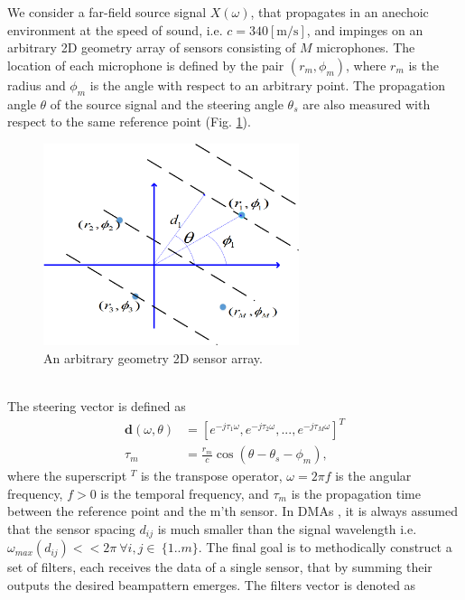 \documentclass{article}
\begin{document}
We consider a far-field source signal $ X(\omega) $, that propagates in an anechoic environment at the speed of sound, i.e. $ c=340 \mathrm{[m/s]} $, and impinges on an arbitrary 2D geometry array of sensors consisting of $ M $ microphones. 
The location of each microphone is defined by the pair $ \left(r_m,\phi_m\right) $, where $ r_m $ is the radius and $ \phi_m $ is the angle with respect to an arbitrary point.
The propagation angle $ \theta $ of the source signal and the steering angle $ \theta_s $ are also measured with respect to the same reference point (Fig. \ref{FigLbl_ArrShape}).
\begin{figure}[h]
	\centerline{\includegraphics[width=75mm,trim={2cm 2cm 2cm 4cm},clip]{ProblemFormulationVisio.png}} \caption{An arbitrary geometry 2D sensor array.}\label{FigLbl_ArrShape}
\end{figure}\\
The steering vector is defined as
\begin{equation}
\begin{split}
\boldsymbol{d}(\omega,\theta)&=\left[e^{-j\tau_1\omega},e^{-j\tau_2\omega},...,e^{-j\tau_M\omega}\right]^T
\\        \tau_m&=\frac{r_m}{c}\cos{\left(\theta-\theta_s-\phi_m\right)},
\end{split}
\end{equation}
where the superscript $ ^T $ is the transpose operator, 
$ \omega=2\pi f $ is the angular frequency, $ f>0 $ is the temporal frequency, and $ \tau_m $ is the propagation time between the reference point and the m'th sensor.
In DMAs \cite{sps17}, it is always assumed that the sensor spacing $ d_{ij} $ is much smaller than the signal wavelength i.e. $ \omega_{max}{(d_{ij})} << 2\pi \ \forall i,j \in \ \{1..m\} $. The final goal is to methodically construct a set of filters, each receives the data of a single sensor, that by summing their outputs the desired beampattern emerges. The filters vector is denoted as 
\end{document}

